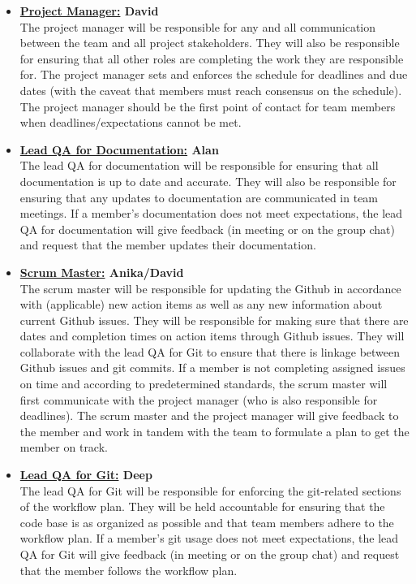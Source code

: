\documentclass{article}
\begin{document}
\begin{itemize}
	\item \textbf{\underline{Project Manager:} David} \\
	The project manager will be responsible for any and all communication between the team and all project stakeholders. 
	They will also be responsible for ensuring that all other roles are completing the work they are responsible for. 
	The project manager sets and enforces the schedule for deadlines and due dates (with the caveat that members must reach consensus on the schedule). 
	The project manager should be the first point of contact for team members when deadlines/expectations cannot be met. 

	\item \textbf{\underline{Lead QA for Documentation:} Alan} \\
	The lead QA for documentation will be responsible for ensuring that all documentation is up to date and accurate.
	They will also be responsible for ensuring that any updates to documentation are communicated in team meetings.
	If a member's documentation does not meet expectations, the lead QA for documentation will give feedback (in meeting or on the group chat) 
	and request that the member updates their documentation.
	
	\item \textbf{\underline{Scrum Master:} Anika/David} \\
	The scrum master will be responsible for updating the Github in accordance with (applicable) new action items 
	as well as any new information about current Github issues. 
	They will be responsible for making sure that there are dates and completion times on action items through Github issues. 
	They will collaborate with the lead QA for Git to ensure that there is linkage between Github issues and git commits. 
	If a member is not completing assigned issues on time and according to predetermined standards, the scrum master will first 
	communicate with the project manager (who is also responsible for deadlines).
	The scrum master and the project manager will give feedback to the member and work in tandem 
	with the team to formulate a plan to get the member on track.

	\item \textbf{\underline{Lead QA for Git:} Deep} \\
	The lead QA for Git will be responsible for enforcing the git-related sections of the workflow plan. 
	They will be held accountable for ensuring that the code base is as organized as possible and 
	that team members adhere to the workflow plan.
	If a member's git usage does not meet expectations, the lead QA for Git will give 
	feedback (in meeting or on the group chat) and request that the member follows the workflow plan.


\end{itemize}
\end{document}
